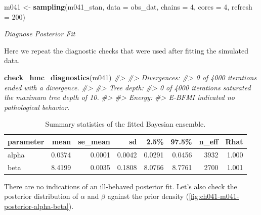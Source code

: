 \documentclass[11pt, oneside, openany]{scrbook}
\newenvironment{Shaded}{\begin{snugshade}}{\end{snugshade}}
\newcommand{\AttributeTok}[1]{\textcolor[rgb]{0.13,0.29,0.53}{#1}}
\newcommand{\CommentTok}[1]{\textcolor[rgb]{0.56,0.35,0.01}{\textit{#1}}}
\newcommand{\DecValTok}[1]{\textcolor[rgb]{0.00,0.00,0.81}{#1}}
\newcommand{\FunctionTok}[1]{\textcolor[rgb]{0.13,0.29,0.53}{\textbf{#1}}}
\newcommand{\NormalTok}[1]{#1}
\newcommand{\OtherTok}[1]{\textcolor[rgb]{0.56,0.35,0.01}{#1}}
\begin{document}

\begin{Shaded}
\begin{Highlighting}[]
\NormalTok{m041 }\OtherTok{\textless{}{-}} \FunctionTok{sampling}\NormalTok{(m041\_stan, }\AttributeTok{data =}\NormalTok{ obs\_dat, }
                 \AttributeTok{chains =} \DecValTok{4}\NormalTok{, }\AttributeTok{cores =} \DecValTok{4}\NormalTok{, }\AttributeTok{refresh =} \DecValTok{200}\NormalTok{)}
\end{Highlighting}
\end{Shaded}


\emph{Diagnose Posterior Fit}

Here we repeat the diagnostic checks that were used after fitting the simulated data.


\begin{Shaded}
\begin{Highlighting}[]
\FunctionTok{check\_hmc\_diagnostics}\NormalTok{(m041)}
\CommentTok{\#\textgreater{} }
\CommentTok{\#\textgreater{} Divergences:}
\CommentTok{\#\textgreater{} 0 of 4000 iterations ended with a divergence.}
\CommentTok{\#\textgreater{} }
\CommentTok{\#\textgreater{} Tree depth:}
\CommentTok{\#\textgreater{} 0 of 4000 iterations saturated the maximum tree depth of 10.}
\CommentTok{\#\textgreater{} }
\CommentTok{\#\textgreater{} Energy:}
\CommentTok{\#\textgreater{} E{-}BFMI indicated no pathological behavior.}
\end{Highlighting}
\end{Shaded}


\begin{table}[!h]
\centering
\caption{\label{tab:ch041-Maroon-Oyster}Summary statistics of the fitted Bayesian ensemble.}
\centering
\begin{tabular}[t]{lrrrrrrr}
\toprule
parameter & mean & se\_mean & sd & 2.5\% & 97.5\% & n\_eff & Rhat\\
\midrule
alpha & 0.0374 & 0.0001 & 0.0042 & 0.0291 & 0.0456 & 3932 & 1.000\\
beta & 8.4199 & 0.0035 & 0.1808 & 8.0766 & 8.7761 & 2700 & 1.001\\
\bottomrule
\end{tabular}
\end{table}

There are no indications of an ill-behaved posterior fit. Let's also check the posterior distribution of \(\alpha\) and \(\beta\) against the prior density (\ref{fig:ch041-m041-posterior-alpha-beta}).
\end{document}
